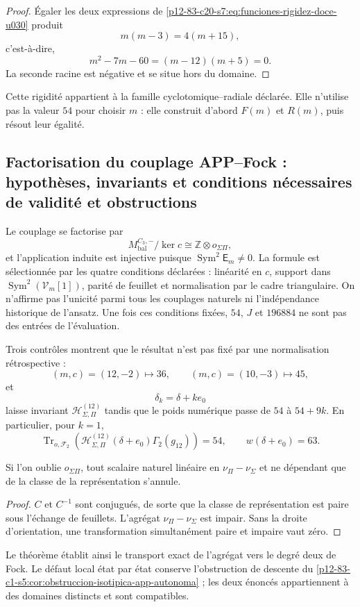 \begin{proof}
Égaler les deux expressions de
\eqref{p12-83-c20-s7:eq:funciones-rigidez-doce-u030} produit
\[
 m(m-3)=4(m+15),
\]
c’est-à-dire,
\[
 m^2-7m-60=(m-12)(m+5)=0.
\]
La seconde racine est négative et se situe hors du domaine.
\end{proof}

Cette rigidité appartient à la famille cyclotomique--radiale déclarée. Elle n'utilise pas la
valeur \(54\) pour choisir \(m\) : elle construit d'abord \(F(m)\) et \(R(m)\), puis
résout leur égalité.

\subsection{Factorisation du couplage APP–Fock : hypothèses, invariants et conditions nécessaires de validité et obstructions}

Le couplage se factorise par
\[
M_{\mathrm{bal}}^{C_3,-}/\ker c
\cong\mathbb Z\otimes o_{\Sigma\Pi},
\]
et l'application induite est injective puisque
\(\operatorname{Sym}^2\mathsf E_m\neq0\).
La formule est sélectionnée par les quatre conditions déclarées :
linéarité en \(c\), support dans
\(\operatorname{Sym}^2(\mathcal V_m[1])\), parité
de feuillet et normalisation par le cadre triangulaire. On n'affirme pas l'unicité
parmi tous les couplages naturels ni l'indépendance historique de
l'ansatz. Une fois ces conditions fixées, \(54\), \(J\) et \(196884\) ne
sont pas des entrées de l'évaluation.

Trois contrôles montrent que le résultat n'est pas fixé par une
normalisation rétrospective :
\[
(m,c)=(12,-2)\longmapsto36,\qquad
(m,c)=(10,-3)\longmapsto45,
\]
et
\[
\delta_k=\delta+ke_0
\]
laisse invariant \(\mathcal H_{\Sigma,\Pi}^{(12)}\) tandis que le poids numérique
passe de \(54\) à \(54+9k\). En particulier, pour \(k=1\),
\[
\operatorname{Tr}_{o,\mathcal F_2}
\left(
\mathcal H_{\Sigma,\Pi}^{(12)}(\delta+e_0)\Gamma_2(g_{12})
\right)=54,
\qquad
w(\delta+e_0)=63.
\]

\begin{proposition}
\label{p12-83-c20-s7:prop:orientacion-app-fock}
Si l'on oublie \(o_{\Sigma\Pi}\), tout scalaire naturel linéaire en
\(\nu_\Pi-\nu_\Sigma\) et ne dépendant que de la classe de la représentation
s'annule.
\end{proposition}

\begin{proof}
\(C\) et \(C^{-1}\) sont conjugués, de sorte que la classe de représentation est
paire sous l'échange de feuillets. L'agrégat
\(\nu_\Pi-\nu_\Sigma\) est impair. Sans la droite d'orientation, une
transformation simultanément paire et impaire vaut zéro.
\end{proof}

Le théorème établit ainsi le transport exact de l'agrégat vers le degré deux de
Fock. Le défaut local état par état conserve l'obstruction de descente
du \cref{p12-83-c1-s5:cor:obstruccion-isotipica-app-autonoma} ; les deux énoncés appartiennent à
des domaines distincts et sont compatibles.


